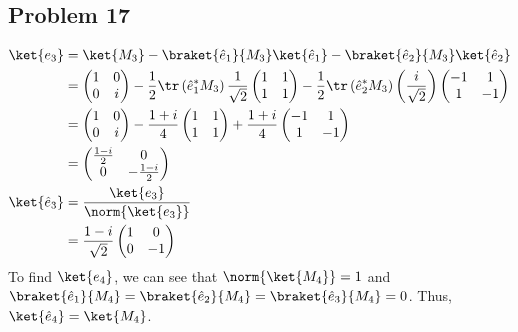 \documentclass[10pt]{mypackage}
\begin{document}
\subsection{Problem 17}%
\begin{align*}
  \ket{e_3} &= \ket{M_{3}} - \braket{\hat{e}_1}{M_{3}}\ket{\hat{e}_1} - \braket{\hat{e}_{2}}{M_3}\ket{\hat{e}_2}\\
            &= \begin{pmatrix}1 & 0 \\ 0 & i\end{pmatrix} - \frac{1}{2}\tr\left(\hat{e}_{1}^{\ast}M_{3}\right) \frac{1}{\sqrt{2}} \begin{pmatrix}1 & 1 \\ 1 & 1\end{pmatrix} - \frac{1}{2}\tr\left(\hat{e}_{2}^{\ast}M_{3}\right) \left(\frac{i}{\sqrt{2}}\right)\begin{pmatrix}-1 & 1 \\ 1 & -1\end{pmatrix}\\
            &= \begin{pmatrix}1 & 0 \\ 0 & i\end{pmatrix} - \frac{1+i}{4} \begin{pmatrix}1 & 1\\1 & 1\end{pmatrix} + \frac{1+i}{4} \begin{pmatrix}-1 & 1 \\ 1 & -1\end{pmatrix}\\
            &= \begin{pmatrix}\frac{1-i}{2} & 0 \\ 0 & -\frac{1-i}{2}\end{pmatrix}\\
  \ket{\hat{e}_3} &= \frac{\ket{e_3}}{\norm{\ket{e_3}}}\\
                  &= \frac{1-i}{\sqrt{2}} \begin{pmatrix}1 & 0 \\ 0 & -1\end{pmatrix}\\
\end{align*}
To find $\ket{e_4}$, we can see that $\norm{\ket{M_4}} = 1$ and $\braket{\hat{e}_1}{M_4} = \braket{\hat{e}_2}{M_4} = \braket{\hat{e}_3}{M_4} = 0$. Thus, $\ket{\hat{e}_4} = \ket{M_4}$.
\end{document}
